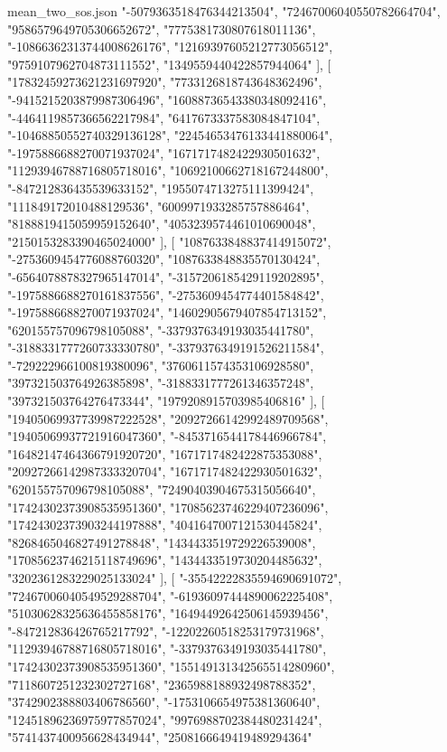 \begin{filecontents*}[overwrite]{mean_two_sos.json}
    "-5079363518476344213504",
    "72467006040550782664704",
    "9586579649705306652672",
    "7775381730807618011136",
    "-10866362313744008626176",
    "12169397605212773056512",
    "9759107962704873111552",
    "1349559440422857944064"
   ],
   [
    "17832459273621231697920",
    "7733126818743648362496",
    "-9415215203879987306496",
    "16088736543380348092416",
    "-4464119857366562217984",
    "6417673337583084847104",
    "-10468850552740329136128",
    "22454653476133441880064",
    "-1975886688270071937024",
    "1671717482422930501632",
    "11293946788716805718016",
    "10692100662718167244800",
    "-847212836435539633152",
    "1955074713275111399424",
    "111849172010488129536",
    "6009971933285757886464",
    "8188819415059959152640",
    "4053239574461010690048",
    "2150153283390465024000"
   ],
   [
    "1087633848837414915072",
    "-2753609454776088760320",
    "1087633848835570130424",
    "-6564078878327965147014",
    "-3157206185429119202895",
    "-1975886688270161837556",
    "-2753609454774401584842",
    "-1975886688270071937024",
    "14602905679407854713152",
    "620155757096798105088",
    "-3379376349193035441780",
    "-3188331777260733330780",
    "-3379376349191526211584",
    "-729222966100819380096",
    "3760611574353106928580",
    "397321503764926385898",
    "-3188331777261346357248",
    "397321503764276473344",
    "1979208915703985406816"
   ],
   [
    "19405069937739987222528",
    "20927266142992489709568",
    "19405069937721916047360",
    "-8453716544178446966784",
    "16482147464366791920720",
    "1671717482422875353088",
    "20927266142987333320704",
    "1671717482422930501632",
    "620155757096798105088",
    "72490403904675315056640",
    "17424302373908535951360",
    "17085623746229407236096",
    "17424302373903244197888",
    "4041647007121530445824",
    "8268465046827491278848",
    "1434433519729226539008",
    "17085623746215118749696",
    "1434433519730204485632",
    "3202361283229025133024"
   ],
   [
    "-35542222835594690691072",
    "72467006040549529288704",
    "-61936097444890062225408",
    "51030628325636455858176",
    "16494492642506145939456",
    "-847212836426765217792",
    "-12202260518253179731968",
    "11293946788716805718016",
    "-3379376349193035441780",
    "17424302373908535951360",
    "155149131342565514280960",
    "7118607251232302727168",
    "2365988188932498788352",
    "3742902388803406786560",
    "-1753106654975381360640",
    "12451896236975977857024",
    "9976988702384480231424",
    "5741437400956628434944",
    "2508166649419489294364"

\end{filecontents*}
